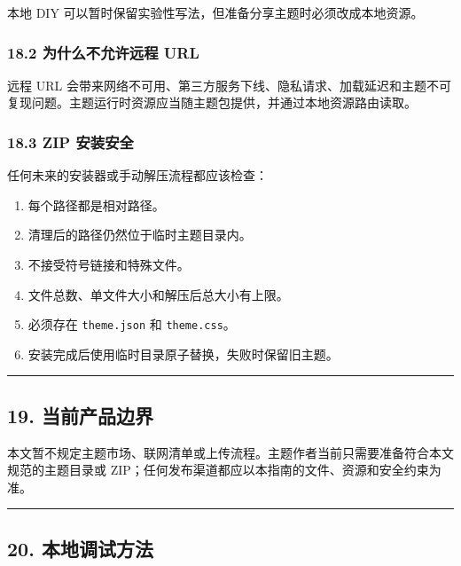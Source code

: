 \documentclass[UTF8,11pt,a4paper]{ctexart}
\providecommand{\tightlist}{%
  \setlength{\itemsep}{0pt}\setlength{\parskip}{0pt}}
\begin{document}
本地 DIY 可以暂时保留实验性写法，但准备分享主题时必须改成本地资源。

\subsubsection{18.2 为什么不允许远程
URL}\label{182-ux4e3aux4ec0ux4e48ux4e0dux5141ux8bb8ux8fdcux7a0b-url}

远程 URL
会带来网络不可用、第三方服务下线、隐私请求、加载延迟和主题不可复现问题。主题运行时资源应当随主题包提供，并通过本地资源路由读取。

\subsubsection{18.3 ZIP
安装安全}\label{183-zip-ux5b89ux88c5ux5b89ux5168}

任何未来的安装器或手动解压流程都应该检查：

\begin{enumerate}
\def\labelenumi{\arabic{enumi}.}
\tightlist
\item
  每个路径都是相对路径。
\item
  清理后的路径仍然位于临时主题目录内。
\item
  不接受符号链接和特殊文件。
\item
  文件总数、单文件大小和解压后总大小有上限。
\item
  必须存在 \texttt{theme.json} 和 \texttt{theme.css}。
\item
  安装完成后使用临时目录原子替换，失败时保留旧主题。
\end{enumerate}

\begin{center}\rule{0.5\linewidth}{0.5pt}\end{center}

\subsection{19.
当前产品边界}\label{19-ux5f53ux524dux4ea7ux54c1ux8fb9ux754c}

本文暂不规定主题市场、联网清单或上传流程。主题作者当前只需要准备符合本文规范的主题目录或
ZIP；任何发布渠道都应以本指南的文件、资源和安全约束为准。

\begin{center}\rule{0.5\linewidth}{0.5pt}\end{center}

\subsection{20.
本地调试方法}\label{20-ux672cux5730ux8c03ux8bd5ux65b9ux6cd5}
\end{document}
